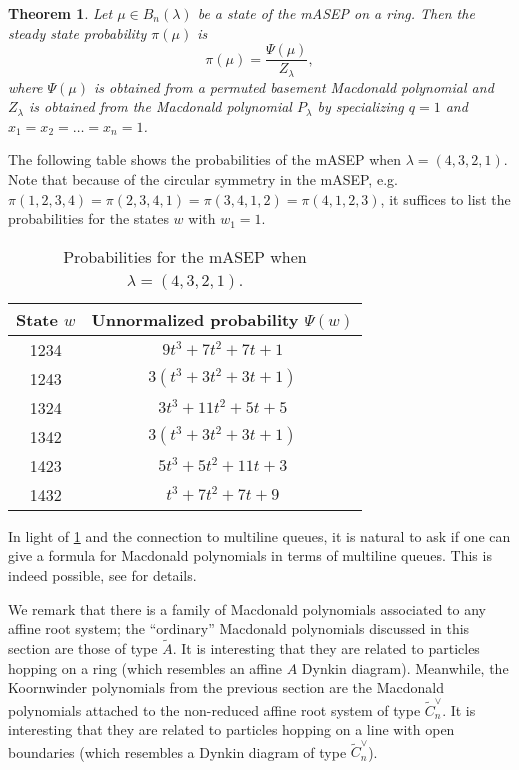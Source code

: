 \documentclass[11pt]{amsart}
\newtheorem{theorem}{Theorem}[section]
\theoremstyle{definition}
\theoremstyle{remark}
\begin{document}
\begin{theorem}\label{thm:Mac}
Let $\mu \in B_n(\lambda)$ be a state of the 
mASEP on a ring.  Then the steady state probability 
$\pi(\mu)$ %
	is $$\pi(\mu)=\frac{\Psi(\mu)}{Z_{\lambda}},$$
	where $\Psi({\mu})$ 
is obtained from a \emph{permuted basement
	Macdonald polynomial} and 
	 $Z_{\lambda}$
	is obtained from the \emph{Macdonald polynomial}
$P_{\lambda}$ by specializing
$q=1$ and $x_1=x_2=\dots=x_n=1$.
\end{theorem}
	
The following table shows the  probabilities of the mASEP when 
$\lambda=(4,3,2,1)$.  Note that because of the circular symmetry in the mASEP,
e.g. $\pi(1,2,3,4)=\pi(2,3,4,1)=\pi(3,4,1,2)=\pi(4,1,2,3)$, it suffices to list
the probabilities for the states $w$ with $w_1=1$.

\begin{table}[h]
\begin{center}
\begin{tabular}{|c c| }
    \hline
	State $w$ & Unnormalized probability $\Psi(w)$\\
    \hline 
    1234 & $9t^3+7t^2+7t+1$\\
	1243 & $3(t^3+3t^2+3t+1)$\\
	1324 & $3t^3+11t^2+5t+5$\\
	1342 & $3(t^3+3t^2+3t+1)$\\
	1423 & $5t^3+5t^2+11t+3$\\
	1432 & $t^3+7t^2+7t+9$\\ 
    \hline
    \end{tabular}
\end{center}
	\caption{Probabilities for the 
	mASEP when $\lambda=(4,3,2,1)$.}\label{table:2}
\end{table}
\normalsize{


In light of 
\cref{thm:Mac} and the connection to multiline queues, 
it is natural to ask if one can give a formula for Macdonald
polynomials in terms of multiline queues.   This is indeed possible,
see \cite{CMW2} for details.
}

We remark that there is a family of 
Macdonald polynomials associated to any affine root system;
the ``ordinary'' Macdonald polynomials discussed in this section
are those of type $\tilde{A}$.  It is interesting that they
are related to particles hopping on a ring (which 
resembles
an affine $A$ Dynkin diagram).  Meanwhile, the Koornwinder
polynomials from the previous section
are the 
Macdonald 
 polynomials attached to the non-reduced affine root system
 of type
$\tilde{C}_n^{\vee}$. 
It is interesting that they are related to particles hopping
on a line with open boundaries (which 
 resembles a Dynkin diagram of type 
$\tilde{C}_n^{\vee}$).
\end{document}
